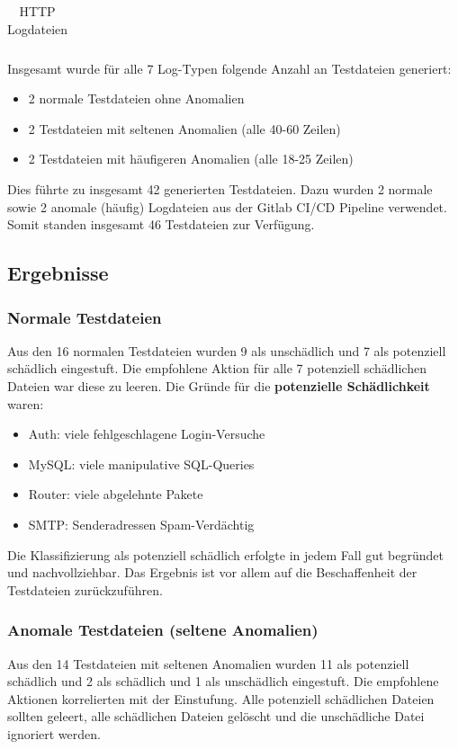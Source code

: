 \documentclass[a4paper,12pt]{report}
\begin{document}
\begin{table}[h!]
\begin{tabular}{|c|p{6cm}|p{6cm}|}
        \end{tabular}
        \caption{HTTP Logdateien}\label{tab:table2}
    \end{table}

    \clearpage
    Insgesamt wurde für alle 7 Log-Typen folgende Anzahl an Testdateien generiert:
    \begin{itemize}
        \item 2 normale Testdateien ohne Anomalien
        \item 2 Testdateien mit seltenen Anomalien (alle 40-60 Zeilen)
        \item 2 Testdateien mit häufigeren Anomalien (alle 18-25 Zeilen)
    \end{itemize}
    Dies führte zu insgesamt 42 generierten Testdateien.
    Dazu wurden 2 normale sowie 2 anomale (häufig) Logdateien aus der Gitlab CI/CD Pipeline verwendet.
    Somit standen insgesamt 46 Testdateien zur Verfügung.

    \subsection{Ergebnisse}\label{subsec:ergebnisse}
    \subsubsection{Normale Testdateien}
    Aus den 16 normalen Testdateien wurden 9 als unschädlich und 7 als potenziell schädlich eingestuft.
    Die empfohlene Aktion für alle 7 potenziell schädlichen Dateien war diese zu leeren.
    Die Gründe für die \textbf{potenzielle Schädlichkeit} waren:
    \begin{itemize}
        \item Auth: viele fehlgeschlagene Login-Versuche
        \item MySQL: viele manipulative SQL-Queries
        \item Router: viele abgelehnte Pakete
        \item SMTP: Senderadressen Spam-Verdächtig
    \end{itemize}
    Die Klassifizierung als potenziell schädlich erfolgte in jedem Fall gut begründet und nachvollziehbar.
    Das Ergebnis ist vor allem auf die Beschaffenheit der Testdateien zurückzuführen.

    \subsubsection{Anomale Testdateien (seltene Anomalien)}
    Aus den 14 Testdateien mit seltenen Anomalien wurden 11 als potenziell schädlich und 2 als schädlich  und 1 als unschädlich eingestuft.
    Die empfohlene Aktionen korrelierten mit der Einstufung.
    Alle potenziell schädlichen Dateien sollten geleert, alle schädlichen Dateien gelöscht und die unschädliche Datei ignoriert werden.
\end{document}
